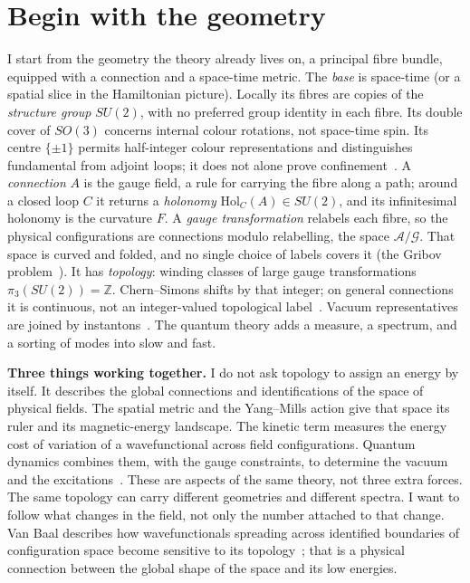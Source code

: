 \section{Begin with the geometry}

I start from the geometry the theory already lives on, a principal fibre bundle, equipped with a connection and a
space-time metric. The \emph{base} is space-time (or a spatial slice in the Hamiltonian picture).
Locally its fibres are copies of the \emph{structure group} $SU(2)$, with no preferred group identity in each fibre.
Its double cover of $SO(3)$ concerns internal colour rotations, not space-time spin. Its centre $\{\pm1\}$ permits
half-integer colour representations and distinguishes fundamental from adjoint loops; it does not alone prove
confinement~\cite{tHooft78}. A \emph{connection} $A$ is the gauge field, a rule for
carrying the fibre along a path; around a closed loop $C$ it returns a \emph{holonomy} $\mathrm{Hol}_C(A)\in SU(2)$, and
its infinitesimal holonomy is the curvature $F$. A \emph{gauge transformation} relabels each fibre, so the physical
configurations are connections modulo relabelling, the space $\mathcal A/\mathcal G$. That space is curved and folded,
and no single choice of labels covers it (the Gribov problem~\cite{Gribov78,Singer78}). It has \emph{topology}: winding
classes of large gauge transformations $\pi_3(SU(2))=\mathbb Z$. Chern--Simons shifts by that integer; on general
connections it is continuous, not an integer-valued topological label~\cite{ChernSimons74}. Vacuum representatives are joined by
instantons~\cite{BPST75,JackiwRebbi76,CallanDashenGross76}. The quantum theory adds a measure, a spectrum, and a sorting of
modes into slow and fast.

\textbf{Three things working together.} I do not ask topology to assign an energy by itself. It describes the global
connections and identifications of the space of physical fields. The spatial metric and the Yang--Mills action give
that space its ruler and its magnetic-energy landscape. The kinetic term measures the energy cost of variation of a
wavefunctional across field configurations. Quantum dynamics combines them, with the gauge constraints, to determine
the vacuum and the excitations~\cite{KogutSusskind75,vanBaal00}. These are aspects of the same theory, not three extra
forces. The same topology can carry different geometries and different spectra. I want to follow what changes in
the field, not only the number attached to that change. Van Baal describes how wavefunctionals spreading across
identified boundaries of configuration space become sensitive to its topology~\cite{vanBaal92Topology}; that is a
physical connection between the global shape of the space and its low energies.

